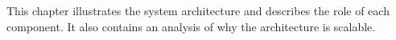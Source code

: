 This chapter illustrates the system architecture and describes the role of each component.
It also contains an analysis of why the architecture is scalable.